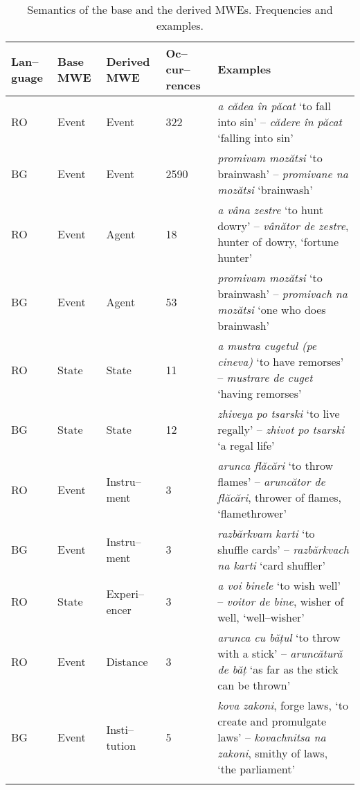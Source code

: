 \documentclass[output=paper]{langsci/langscibook}
\begin{document}
\begin{table}[H]
\begin{tabular}{p{0.9cm}p{1cm}p{1.2cm}p{0.7cm}p{6.2cm}}
\lsptoprule
\textbf{Lan–guage} &
\textbf{Base MWE} &
\textbf{Derived MWE} &
\textbf{Oc–cur–rences} &
\textbf{Examples}\\
\midrule
 RO &
 Event &
 Event &
 322 &
\textit{a cădea în păcat} ‘to fall into
sin’ – \textit{cădere în păcat} ‘falling into sin’\\
 BG &
 Event &
 Event &
 2590 &
 \textit{promivam mozătsi} ‘to brainwash’ –
\textit{promivane na mozătsi} ‘brainwash’\\
 RO &
 Event &
 Agent &
 18 &
 \textit{a vâna zestre} ‘to hunt dowry’ –
\textit{vânător de zestre}, hunter of dowry, ‘fortune
hunter’\\
 BG &
 Event &
 Agent &
 53 &
 \textit{promivam mozătsi} ‘to brainwash’ –
\textit{promivach na mozătsi} ‘one who does brainwash’\\
 RO &
 State &
 State &
 11 &
\textit{a mustra cugetul (pe cineva)} ‘to
have remorses’ – \textit{mustrare de cuget} ‘having remorses’\\
 BG &
 State &
 State &
 12 &
\textit{zhiveya po tsarski} `to live regally’
– \textit{zhivot po tsarski} ‘a regal life’\\

 RO &
 Event &
 Instru–ment &
 3 &
\textit{arunca flăcări} ‘to throw flames’ –
\textit{aruncător de flăcări}, thrower of flames, 
‘flamethrower’\\
 BG &
 Event &
 Instru–ment &
 3 &
\textit{razbărkvam karti} ‘to shuffle cards’ –
\textit{razbărkvach na karti} ‘card shuffler’\\
 RO &
 State &
 Experi–encer &
 3 &
\textit{a voi binele} ‘to wish well’ –
\textit{voitor de bine}, wisher of well, ‘well–wisher’\\
 RO &
 Event &
 Distance &
 3 &
\textit{arunca cu bățul} ‘to throw with a
stick’ – \textit{aruncătură de băț} ‘as far as the stick can be thrown’\\
 BG &
 Event &
 Insti–tution &
 5 &
\textit{kova zakoni}, forge laws, 
‘to create and promulgate laws’ – \textit{kovachnitsa na zakoni}, smithy of
laws, ‘the parliament’\\
\lspbottomrule
\end{tabular}
\caption{Semantics of the base and the derived MWEs. Frequencies and examples.}
\label{tab:8:5}
\end{table}
\end{document}
